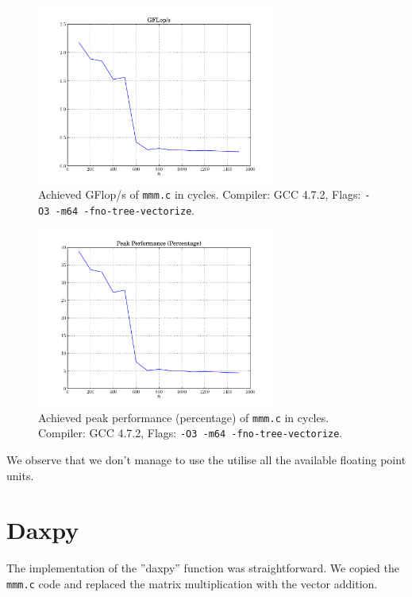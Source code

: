 \documentclass[portrait,a4paper]{article}
\begin{document}
\begin{figure}[H]
\centering
\includegraphics[width=0.7\textwidth]{mmm/GFlops.pdf}
\caption{Achieved GFlop/s of \lstinline{mmm.c} in cycles. Compiler: GCC 4.7.2, Flags: \lstinline{-O3 -m64 -fno-tree-vectorize}.}
\end{figure}

\begin{figure}[H]
\centering
\includegraphics[width=0.7\textwidth]{mmm/PeakPerformancePercentage.pdf}
\caption{Achieved peak performance (percentage) of \lstinline{mmm.c} in cycles. Compiler: GCC 4.7.2, Flags: \lstinline{-O3 -m64 -fno-tree-vectorize}.}
\end{figure}
We observe that we don't manage to use the utilise all the available floating point units. 

\section{Daxpy}
The implementation of the ''daxpy'' function was straightforward. We copied the \lstinline{mmm.c} code and replaced the matrix multiplication with the vector addition. 
\end{document}
